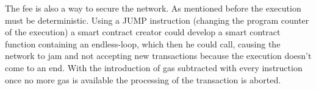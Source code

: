 The fee is also a way to secure the network. As mentioned before the execution must be deterministic. Using a JUMP instruction (changing the program counter of the execution) a smart contract creator could develop a smart contract function containing an endless-loop, which then he could call, causing the network to jam and not accepting new transactions because the execution doesn't come to an end. With the introduction of gas subtracted with every instruction once no more gas is available the processing of the transaction is aborted.
